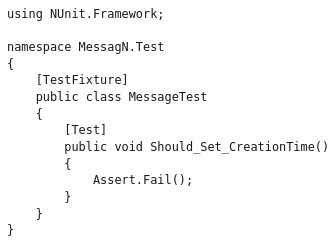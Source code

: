 \begin{verbatim}

using NUnit.Framework;

namespace MessagN.Test
{
    [TestFixture]
    public class MessageTest
    {
        [Test]
        public void Should_Set_CreationTime()
        {
            Assert.Fail();
        }
    }
}

\end{verbatim}